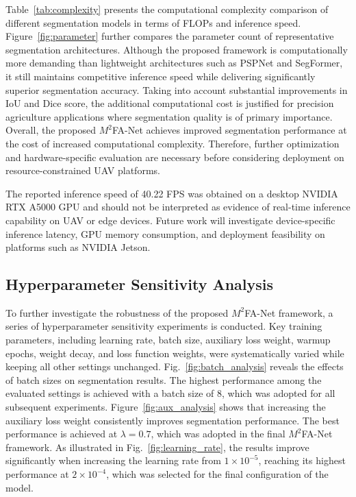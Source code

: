 \documentclass[pdflatex,sn-mathphys-num]{sn-jnl}
\begin{document}
Table~\ref{tab:complexity} presents the computational complexity comparison of different segmentation models in terms of FLOPs and inference speed. Figure~\ref{fig:parameter} further compares the parameter count of representative segmentation architectures. Although the proposed framework is computationally more demanding than lightweight architectures such as PSPNet and SegFormer, it still maintains competitive inference speed while delivering significantly superior segmentation accuracy. Taking into account substantial improvements in IoU and Dice score, the additional computational cost is justified for precision agriculture applications where segmentation quality is of primary importance. Overall, the proposed $M^2$FA-Net achieves improved segmentation performance at the cost of increased computational complexity. Therefore, further optimization and hardware-specific evaluation are necessary before considering deployment on resource-constrained UAV platforms.

The reported inference speed of 40.22 FPS was obtained on a desktop NVIDIA RTX A5000 GPU and should not be interpreted as evidence of real-time inference capability on UAV or edge devices. Future work will investigate device-specific inference latency, GPU memory consumption, and deployment feasibility on platforms such as NVIDIA Jetson.




\subsection{Hyperparameter Sensitivity Analysis}
To further investigate the robustness of the proposed $M^2$FA-Net framework, a series of hyperparameter sensitivity experiments is conducted. Key training parameters, including learning rate, batch size, auxiliary loss weight, warmup epochs, weight decay, and loss function weights, were systematically varied while keeping all other settings unchanged. 
Fig.~\ref{fig:batch_analysis} reveals the effects of batch sizes on segmentation results. The highest performance among the evaluated settings is achieved with a batch size of 8, which was adopted for all subsequent experiments.
Figure~\ref{fig:aux_analysis} shows that increasing the auxiliary loss weight consistently improves segmentation performance. The best performance is achieved at $\lambda=0.7$, which was adopted in the final $M^2$FA-Net framework.
As illustrated in Fig.~\ref{fig:learning_rate}, the results improve significantly when increasing the learning rate from $1\times10^{-5}$, reaching its highest performance at $2\times10^{-4}$, which was selected for the final configuration of the model.
\end{document}
